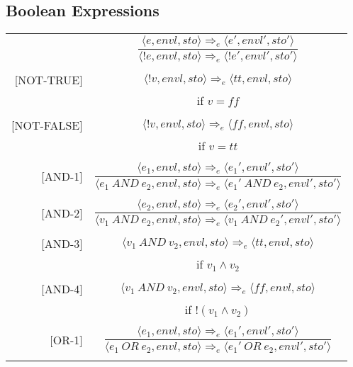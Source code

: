 \subsection{Boolean Expressions}
\begin{longtable}[c] { r c }
  \centering
  [NOT-1] & \( 
    \dfrac { \langle e, envl, sto \rangle \Rightarrow_e \langle e', envl', sto' \rangle }
      { \langle !e, envl, sto \rangle \Rightarrow_e \langle !e', envl', sto' \rangle } \)
  \\
  & \\

  [NOT-TRUE] & \( 
    \langle !v, envl, sto \rangle \Rightarrow_e \langle tt, envl, sto \rangle \)
  \\
  & if \( v = ff\) \\
  & \\

  [NOT-FALSE] & \( 
    \langle !v, envl, sto \rangle \Rightarrow_e \langle ff, envl, sto \rangle \)
  \\
  & if \( v = tt \) \\
  & \\

  [AND-1] & \( 
    \dfrac { \langle e_1, envl, sto \rangle \Rightarrow_e \langle e_1', envl', sto' \rangle }
      { \langle e_1 \ AND \ e_2, envl, sto \rangle \Rightarrow_e \langle e_1' \ AND \ e_2, envl', sto' \rangle } \)
  \\
  & \\

  [AND-2] & \( 
    \dfrac { \langle e_2, envl, sto \rangle \Rightarrow_e \langle e_2', envl', sto' \rangle }
      { \langle v_1 \ AND \ e_2, envl, sto \rangle \Rightarrow_e \langle v_1 \ AND \ e_2', envl', sto' \rangle } \)
  \\
  & \\

  [AND-3] & \( 
    \langle v_1 \ AND \ v_2, envl, sto \rangle \Rightarrow_e \langle tt, envl, sto \rangle \)
  \\
  & if \( v_1 \land v_2 \) \\
  & \\

  [AND-4] & \( 
    \langle v_1 \ AND \ v_2, envl, sto \rangle \Rightarrow_e \langle ff, envl, sto \rangle \)
  \\
  & if \( !(v_1 \land v_2) \) \\
  & \\

  [OR-1] & \( 
    \dfrac { \langle e_1, envl, sto \rangle \Rightarrow_e \langle e_1', envl', sto' \rangle }
      { \langle e_1 \ OR \ e_2, envl, sto \rangle \Rightarrow_e \langle e_1' \ OR \ e_2, envl', sto' \rangle } \)
  \\
  & \\


\end{longtable}
